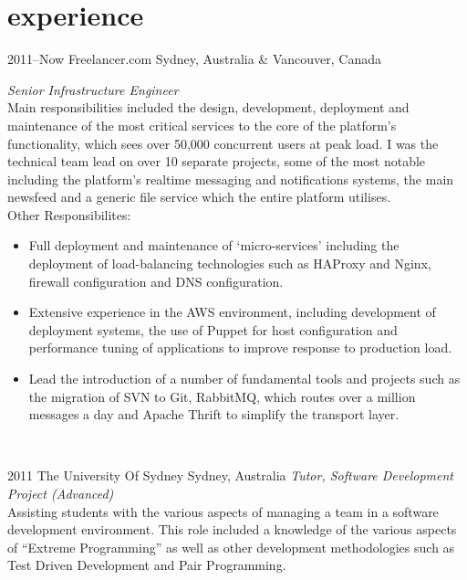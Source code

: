 \documentclass[]{friggeri-cv} %
\begin{document}

\section{experience}

\begin{entrylist}
\entry
{2011--Now}
{Freelancer.com}
{Sydney, Australia \& Vancouver, Canada}
{\emph{Senior Infrastructure Engineer} \\

Main responsibilities included the design, development, deployment and maintenance of the most critical services to the core of the platform’s functionality, which sees over 50,000 concurrent users 
at peak load. I was the technical team lead on over 10 separate projects, some of the most notable including the platform’s realtime messaging and notifications systems, the main newsfeed and a generic file service which the entire platform utilises. \\

Other Responsibilites:\\

\begin{itemize}
    \item Full deployment and maintenance of ‘micro-services’ including the deployment of load-balancing technologies such as HAProxy and Nginx, firewall configuration and DNS configuration.
    \item Extensive experience in the AWS environment, including development of deployment systems, the use of Puppet for host configuration and performance tuning of applications to improve response to production load.
    \item Lead the introduction of a number of fundamental tools and projects such as the migration of SVN to Git, RabbitMQ, which routes over a million messages a day and Apache Thrift to simplify the transport layer.
\end{itemize}
~
}
\entry
{2011}
{The University Of Sydney}
{Sydney, Australia}
{\emph{Tutor, Software Development Project (Advanced)} \\

Assisting students with the various aspects of managing a team in a software development environment.
This role included a knowledge of the various aspects of “Extreme Programming” as well as other development methodologies such as Test Driven Development and Pair Programming. \\
}
\end{entrylist}
\end{document}
